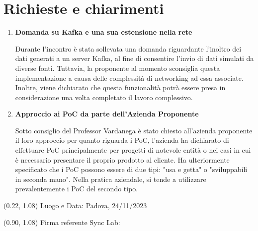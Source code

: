 \documentclass{article}
\begin{document}
\section{Richieste e chiarimenti}
\begin{enumerate}
    \item \textbf{Domanda su Kafka e una sua estensione nella rete}
    
    Durante l'incontro è stata sollevata una domanda riguardante l'inoltro dei dati generati a un server Kafka, al fine di consentire l'invio di dati simulati da diverse fonti. Tuttavia, la proponente al momento sconsiglia questa implementazione a causa delle complessità di networking ad essa associate. 
    Inoltre, viene dichiarato che questa funzionalità potrà essere presa in considerazione una volta completato il lavoro complessivo.
    \item \textbf{Approccio ai PoC da parte dell'Azienda Proponente}
    
    Sotto consiglio del Professor Vardanega è stato chiesto all'azienda proponente il loro approccio per quanto riguarda i PoC, l'azienda ha dichiarato di effettuare PoC principalmente per progetti di notevole entità o nei casi in cui è necessario presentare il proprio prodotto al cliente. Ha ulteriormente specificato che i PoC possono essere di due tipi: "usa e getta" o "sviluppabili in seconda mano". Nella pratica aziendale, si tende a utilizzare prevalentemente i PoC del secondo tipo.
\end{enumerate}
    
    
    
\begin{textblock*}{\textwidth}(0.22\textwidth, 1.08\textheight)
    Luogo e Data: Padova, 24/11/2023
\end{textblock*}

\begin{textblock*}{\textwidth}(0.90\textwidth, 1.08\textheight)
        Firma referente Sync Lab:
\end{textblock*}
\end{document}
